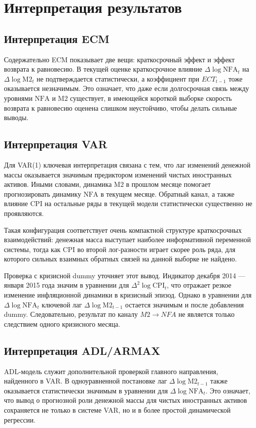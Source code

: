 \documentclass[12pt,a4paper]{article}
\begin{document}
\section{Интерпретация результатов}
\subsection{Интерпретация ECM}
Содержательно ECM показывает две вещи: краткосрочный эффект и эффект возврата к
равновесию. В текущей оценке краткосрочное влияние $\Delta \log \mathrm{NFA}_t$ на $\Delta \log \mathrm{M2}_t$
не подтверждается статистически, а коэффициент при $ECT_{t-1}$ тоже оказывается
незначимым. Это означает, что даже если долгосрочная связь между уровнями $\mathrm{NFA}$ и $\mathrm{M2}$
существует, в имеющейся короткой выборке скорость возврата к равновесию оценена слишком
неустойчиво, чтобы делать сильные выводы.

\subsection{Интерпретация VAR}
Для VAR(1) ключевая интерпретация связана с тем, что лаг изменений денежной массы
оказывается значимым предиктором изменений чистых иностранных активов. Иными словами,
динамика $\mathrm{M2}$ в прошлом месяце помогает прогнозировать динамику $\mathrm{NFA}$ в текущем месяце.
Обратный канал, а также влияние $\mathrm{CPI}$ на остальные ряды в текущей модели статистически
существенно не проявляются.

Такая конфигурация соответствует очень компактной структуре краткосрочных взаимодействий:
денежная масса выступает наиболее информативной переменной системы, тогда как CPI во второй
лог-разности играет скорее роль ряда, для которого сильных взаимных обратных связей на
данной выборке не найдено.

Проверка с кризисной dummy уточняет этот вывод. Индикатор декабря 2014 --- января 2015 года
значим в уравнении для $\Delta^2 \log \mathrm{CPI}_t$, что отражает резкое изменение инфляционной
динамики в кризисный эпизод. Однако в уравнении для $\Delta \log \mathrm{NFA}_t$ ключевой лаг
$\Delta \log \mathrm{M2}_{t-1}$ остается значимым и после добавления dummy. Следовательно, результат
по каналу $M2 \to NFA$ не является только следствием одного кризисного месяца.

\subsection{Интерпретация ADL/ARMAX}
ADL-модель служит дополнительной проверкой главного направления, найденного в VAR. В
одноуравненной постановке лаг $\Delta \log \mathrm{M2}_{t-1}$ также оказывается статистически
значимым в уравнении для $\Delta \log \mathrm{NFA}_t$. Это означает, что вывод о прогнозной роли
денежной массы для чистых иностранных активов сохраняется не только в системе VAR, но и в
более простой динамической регрессии.
\end{document}
